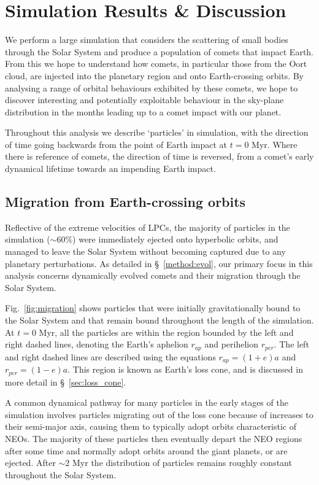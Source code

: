 \chapter{Simulation Results \& Discussion}
\label{chap:results}

We perform a large simulation that considers the scattering of small bodies through the Solar System and produce a population of comets that impact Earth. From this we hope to understand how comets, in particular those from the Oort cloud, are injected into the planetary region and onto Earth-crossing orbits. By analysing a range of orbital behaviours exhibited by these comets, we hope to discover interesting and potentially exploitable behaviour in the sky-plane distribution in the months leading up to a comet impact with our planet.

Throughout this analysis we describe `particles' in simulation, with the direction of time going backwards from the point of Earth impact at $t=0$ Myr. Where there is reference of comets, the direction of time is reversed, from a comet's early dynamical lifetime towards an impending Earth impact.

\section{Migration from Earth-crossing orbits}

Reflective of the extreme velocities of LPCs, the majority of particles in the simulation ($\sim60$\%) were immediately ejected onto hyperbolic orbits, and managed to leave the Solar System without becoming captured due to any planetary perturbations. As detailed in \S~\ref{method:evol}, our primary focus in this analysis concerns dynamically evolved comets and their migration through the Solar System.

Fig.~\ref{fig:migration} shows particles that were initially gravitationally bound to the Solar System and that remain bound throughout the length of the simulation. At $t=0$ Myr, all the particles are within the region bounded by the left and right dashed lines, denoting the Earth's aphelion $r_{ap}$ and perihelion $r_{per}$. The left and right dashed lines are described using the equations $r_{ap} = (1+e)a$ and $r_{per} = (1-e)a$. This region is known as Earth's loss cone, and is discussed in more detail in \S~\ref{sec:loss_cone}. 

A common dynamical pathway for many particles in the early stages of the simulation involves particles migrating out of the loss cone because of increases to their semi-major axis, causing them to typically adopt orbits characteristic of NEOs. The majority of these particles then eventually depart the NEO regions after some time and normally adopt orbits around the giant planets, or are ejected. After $\sim2$ Myr the distribution of particles remains roughly constant throughout the Solar System.


